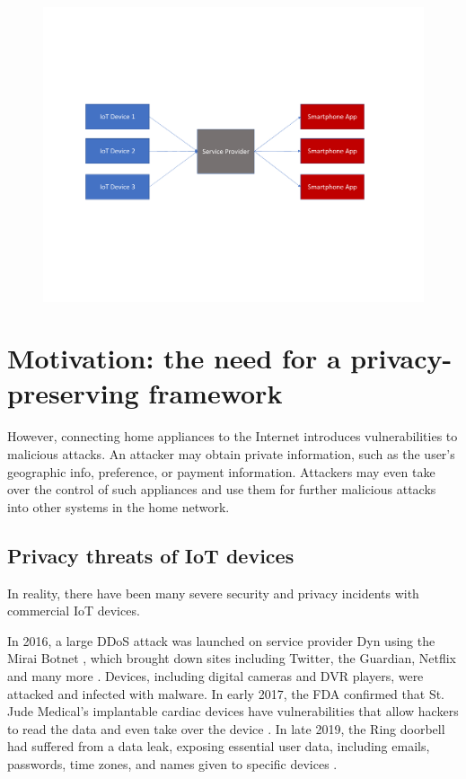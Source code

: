 \begin{figure}
	\includegraphics[width=\linewidth]{centralized_structure.pdf}
	\caption{}
	\label{fig:centralized}
\end{figure}

\section{Motivation: the need for a privacy-preserving framework}
However, connecting home appliances to the Internet introduces vulnerabilities to malicious attacks. An attacker may obtain private information, such as the user's geographic info, preference, or payment information. Attackers may even take over the control of such appliances and use them for further malicious attacks into other systems in the home network. 

\subsection{Privacy threats of IoT devices}
In reality, there have been many severe security and privacy incidents with commercial IoT devices.

In 2016, a large DDoS attack was launched on service provider Dyn using the Mirai Botnet \cite{antonakakis2017understanding}, which brought down sites including Twitter, the Guardian, Netflix and many more \cite{2006mirai}. Devices, including digital cameras and DVR players, were attacked and infected with malware. In early 2017, the FDA confirmed that St. Jude Medical's implantable cardiac devices have vulnerabilities that allow hackers to read the data and even take over the device \cite{2017fda}. In late 2019, the Ring doorbell had suffered from a data leak, exposing essential user data, including emails, passwords, time zones, and names given to specific devices \cite{2019ring}.

